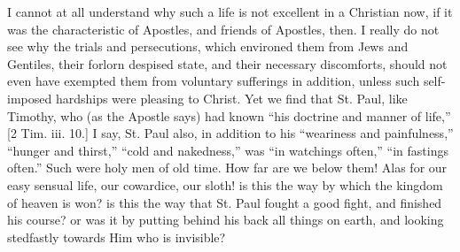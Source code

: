 I cannot at all understand why such a life is not excellent in a
Christian now, if it was the characteristic of Apostles, and friends of
Apostles, then. I really do not see why the trials and persecutions,
which environed them from Jews and Gentiles, their forlorn despised
state, and their necessary discomforts, should not even have exempted
them from voluntary sufferings in addition, unless such self-imposed
hardships were pleasing to Christ. Yet we find that St. Paul, like
Timothy, who (as the Apostle says) had known ``his doctrine and
manner of life,'' [2 Tim. iii. 10.] I say, St. Paul also, in
addition to his ``weariness and painfulness,'' ``hunger and
thirst,'' ``cold and nakedness,'' was ``in watchings
often,'' ``in fastings often.'' Such were holy men of old
time. How far are we below them! Alas for our easy sensual life, our
cowardice, our sloth! is this the way by which the kingdom of heaven is
won? is this the way that St. Paul fought a good fight, and finished his
course? or was it by putting behind his back all things on earth, and
looking stedfastly towards Him who is invisible?

